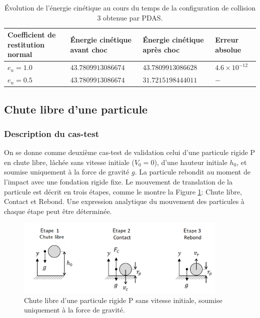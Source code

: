 \begin{center}
\begin{table}[!h]
\begin{tabular}{ |p{3cm}|p{3cm}|p{3cm}|p{2.75cm}| }
 \hline \rowcolor{lightgray}

 \centering Coefficient de restitution normal & \centering Énergie cinétique avant choc & \centering Énergie cinétique après choc & Erreur absolue\\
 \hline
 $e_n = 1.0$ & $43.7809913086674$ & $43.7809913086628$ & $4.6\times10^{-12} $\\
 $e_n = 0.5$ & $43.7809913086674$ & $31.7215198444011$ & $-$\\
 
 \hline
\end{tabular}
\caption{Évolution de l'énergie cinétique au cours du temps de la configuration de collision 3 obtenue par PDAS.}
\end{table}
\end{center}

\subsection{Chute libre d'une particule}

\subsubsection{Description du cas-test}

On se donne comme deuxième cas-test de validation celui d'une particule rigide P en chute libre, lâchée sans vitesse initiale ($V_0 = 0$), d'une hauteur initiale $h_0$, et soumise uniquement à la force de gravité $g$. La particule rebondit au moment de l'impact avec une fondation rigide fixe. Le mouvement de translation de la particule est décrit en trois étapes, comme le montre la Figure \ref{fig35}: Chute libre, Contact et Rebond. Une expression analytique du mouvement des particules à chaque étape peut être déterminée.

\begin{figure}[!h]
  \centering
    \includegraphics[width=0.9\textwidth]{chapitres/chapitre_3/figures/free_fall.png}
    \caption{Chute libre d'une particule rigide P sans vitesse initiale, soumise uniquement à la force de gravité.}\label{fig35}
\end{figure}


